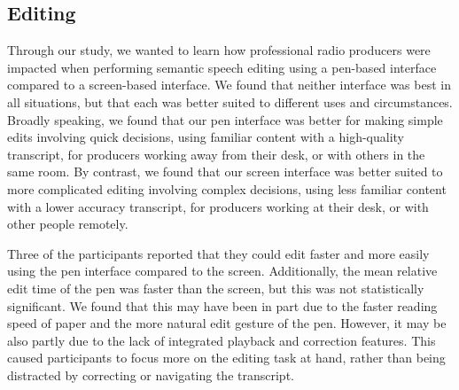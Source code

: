 


\subsection{Editing}


Through our study, we wanted to learn how professional radio producers were impacted when performing semantic speech
editing using a pen-based interface compared to a screen-based interface.  We found that neither interface was best in
all situations, but that each was better suited to different uses and circumstances.  Broadly speaking, we found that
our pen interface was better for making simple edits involving quick decisions, using familiar content with a
high-quality transcript, for producers working away from their desk, or with others in the same room.  By contrast, we
found that our screen interface was better suited to more complicated editing involving complex decisions, using less
familiar content with a lower accuracy transcript, for producers working at their desk, or with other people remotely.

Three of the participants reported that they could edit faster and more easily using the pen interface compared to the
screen. Additionally, the mean relative edit time of the pen was faster than the screen, but this was not statistically
significant. We found that this may have been in part due to the faster reading speed of paper and the more natural
edit gesture of the pen.  However, it may be also partly due to the lack of integrated playback and correction
features.  This caused participants to focus more on the editing task at hand, rather than being distracted by
correcting or navigating the transcript.

